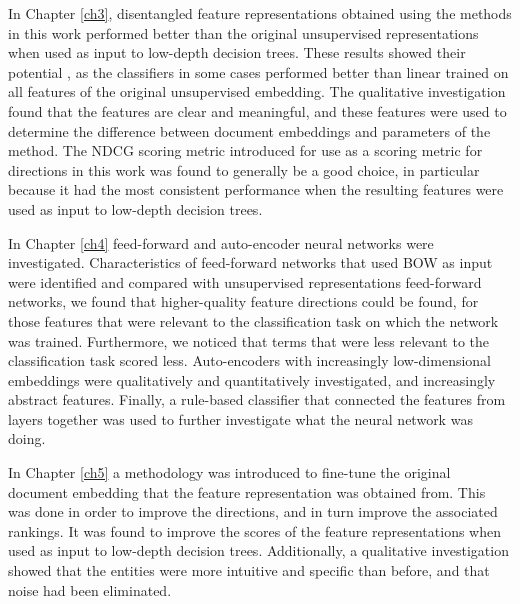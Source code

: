In Chapter \ref{ch3}, disentangled feature representations obtained using the methods in this work performed better than the original unsupervised representations when used as input to low-depth decision trees. These results showed their potential ,  as the classifiers in some cases performed better than linear  trained on all features of the original unsupervised embedding.  The qualitative investigation found that the features are clear and meaningful, and these features were used to determine the difference between document embeddings and parameters of the method. The NDCG scoring metric introduced for use as a scoring metric for directions in this work was found to generally be a good choice, in particular because it had the most consistent performance when the resulting features were used as input to low-depth decision trees. 

In Chapter \ref{ch4} feed-forward and auto-encoder neural networks were  investigated. Characteristics of feed-forward networks that used BOW as input were identified and compared with unsupervised representations feed-forward networks, we found that higher-quality feature directions could be found, for those features that were relevant to the classification task on which the network was trained. Furthermore, we noticed that terms that were less relevant to the classification task scored less. Auto-encoders with increasingly low-dimensional embeddings were qualitatively and quantitatively investigated, and  increasingly abstract features.  Finally,  a rule-based classifier that connected the features from layers together was used to further investigate what the neural network was doing. %

In Chapter \ref{ch5} a methodology was introduced to fine-tune the original document embedding that the feature representation was obtained from. This was done in order to improve the directions, and in turn improve the associated rankings. It was found to improve the scores of the feature representations when used as input to low-depth decision trees. Additionally, a qualitative investigation showed that the entities were more intuitive and specific than before, and that noise had been eliminated.



